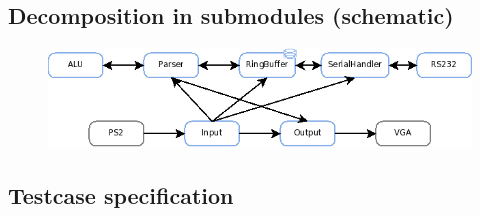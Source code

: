 \subsection{Decomposition in submodules (schematic)}
\begin{figure}[!ht]
 \includegraphics[scale=0.55]{pics/Modules.png}
 \label{fig:Modules}
\end{figure}

\subsection{Testcase specification}
